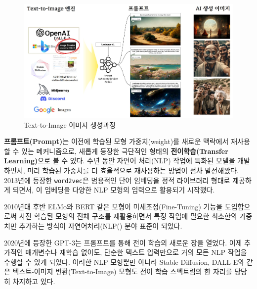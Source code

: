 \documentclass[
  letterpaper,
]{book}
\begin{document}
\begin{figure}

{\centering \includegraphics{images/anyang_t2i.jpg}

}

\caption{Text-to-Image 이미지 생성과정}

\end{figure}

\begin{tcolorbox}[enhanced jigsaw, opacityback=0, opacitybacktitle=0.6, colback=white, rightrule=.15mm, coltitle=black, colframe=quarto-callout-note-color-frame, colbacktitle=quarto-callout-note-color!10!white, bottomrule=.15mm, bottomtitle=1mm, breakable, title=\textcolor{quarto-callout-note-color}{\faInfo}\hspace{0.5em}{텍스트에서 이미지로 진화}, titlerule=0mm, leftrule=.75mm, toptitle=1mm, left=2mm, arc=.35mm, toprule=.15mm]

\textbf{프롬프트(Prompt)}는 이전에 학습된 모형 가중치(weight)를 새로운
맥락에서 재사용할 수 있는 메커니즘으로, 새롭게 등장한 극단적인 형태의
\textbf{전이학습(Transfer Learning)}으로 볼 수 있다. 수년 동안 자연어
처리(NLP) 작업에 특화된 모델을 개발하면서, 미리 학습된 가중치를 더
효율적으로 재사용하는 방법이 점차 발전해왔다. 2013년에 등장한
\texttt{word2vec}은 범용적인 단어 임베딩을 정적 라이브러리 형태로
제공하게 되면서, 이 임베딩을 다양한 NLP 모형의 입력으로 활용되기
시작했다.

2010년대 후반 ELMo와 BERT 같은 모형이 미세조정(Fine-Tuning) 기능을
도입함으로써 사전 학습된 모형의 전체 구조를 재활용하면서 특정 작업에
필요한 최소한의 가중치만 추가하는 방식이 자연어처리(NLP() 분야 표준이
되었다.

2020년에 등장한 GPT-3는 프롬프트를 통해 전이 학습의 새로운 장을 열었다.
이제 추가적인 매개변수나 재학습 없이도, 단순한 텍스트 입력만으로 거의
모든 NLP 작업을 수행할 수 있게 되었다. 이러한 NLP 모형뿐만 아니라 Stable
Diffusion, DALL-E와 같은 텍스트-이미지 변환(Text-to-Image) 모형도 전이
학습 스펙트럼의 한 자리를 당당히 차지하고 있다. \autocite{Turc_2022}

\end{tcolorbox}
\end{document}
